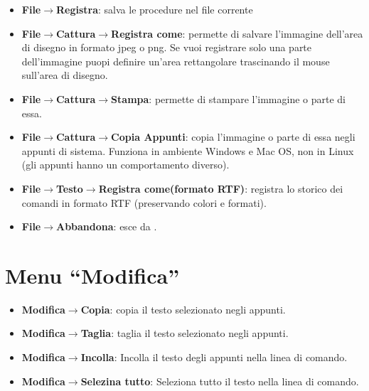 \begin{itemize}
\begin{center}
	\end{center}
	\vspace{0.25cm}
	\item \textbf{File$\to$Registra}: salva le procedure nel file corrente
	\item \textbf{File$\to$Cattura$\to$Registra come\textellipsis}: permette di salvare l'immagine dell'area di disegno in formato jpeg o png. Se vuoi registrare solo una parte dell'immagine puopi definire un'area rettangolare trascinando il mouse sull'area di disegno.
	\vspace{0.25cm}
	\item \textbf{File$\to$Cattura$\to$Stampa\textellipsis}: permette di stampare l'immagine o parte di essa.
	\item \textbf{File$\to$Cattura$\to$Copia Appunti}: copia l'immagine o parte di essa negli appunti di sistema. Funziona in ambiente Windows e Mac OS, non in Linux (gli appunti hanno un comportamento diverso).
	\item \textbf{File$\to$Testo$\to$Registra come\textellipsis (formato RTF)}: registra lo storico dei comandi in formato RTF (preservando colori e formati).
	\item \textbf{File$\to$Abbandona}: esce da \xlogo.
\end{itemize}

\section{Menu ``Modifica''}
\begin{itemize}
	\item \textbf{Modifica$\to$Copia}: copia il testo selezionato negli appunti.
	\item \textbf{Modifica$\to$Taglia}: taglia il testo selezionato negli appunti.
	\item \textbf{Modifica$\to$Incolla}: Incolla il testo degli appunti nella linea di comando.
	\item \textbf{Modifica$\to$Selezina tutto}: Seleziona tutto il testo nella linea di comando.
\end{itemize}

